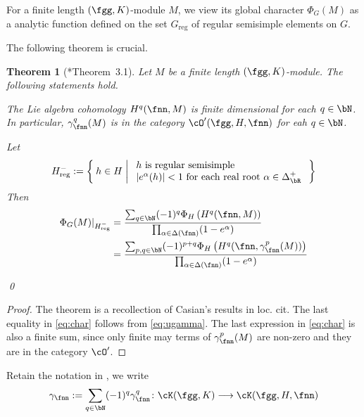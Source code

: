 \documentclass[12pt,a4paper]{amsart}
\def\abs#1{\left|{#1}\right|}
\DeclareMathOperator{\Ann}{Ann}
\numberwithin{equation}{section}
\newtheorem{thm}{Theorem}[section]
\theoremstyle{remark}
\def\WT#1{\Delta(#1)}
\def\Greg{G_{\text{reg}}}
\def\Hnreg{H^-_{\text{reg}}}
\newcommand{\Grt}{\cK}
\begin{document}
For a finite length $(\fgg,K)$-module $M$, we view its global character
$\Phi_{G}(M)$ as a analytic function defined on the set $\Greg$ of regular
semisimple elements on $G$.


The following theorem is crucial.
\begin{thm}[\cite{Cas}*{Theorem~3.1}]\label{thm:gamma.HC}
  Let $M$ be a finite length $(\fgg,K)$-module. The following statements hold.
  \begin{enumT}
    \item The Lie algebra cohomology $H^{q}(\fnn,M)$ is finite dimensional for
    each $q\in \bN$. In particular, $\gamma_{\fnn}^{q}(M)$ is in the category
    $\cO'(\fgg,H,\fnn)$ for eah $q\in \bN$.
    \item
    Let
    \[
      \Hnreg:= \Set{h\in H|
        \begin{array}{l}
          \text{$h$ is regular semisimple}\\
          \abs{e^{\alpha}(h)}<1 \text{ for each real root }
          \alpha\in \Delta^{+}_{\bR}
        \end{array}
      }
    \]
    Then
    \begin{equation}\label{eq:char}
      \begin{split}
        \Phi_{G}(M)|_{\Hnreg} &= \frac{\sum_{q\in \bN} (-1)^{q}\Phi_{H} \left(H^{q}(\fnn,M)\right)}
        {\prod_{\alpha\in \WT{\fnn}}(1- e^{\alpha})}\\
        &= \frac{\sum_{p,q\in \bN} (-1)^{p+q}\Phi_{H} \left(H^{q}(\fnn,\gamma_{\fnn}^{p}(M))\right)}
        {\prod_{\alpha\in \WT{\fnn}}(1- e^{\alpha})}\\
      \end{split}
    \end{equation}
  \end{enumT}
  \qed
\end{thm}
\begin{proof}
  The theorem is a recollection of Casian's results in loc. cit. The last
  equality in \eqref{eq:char} follows from \eqref{eq:ugamma}. The last
  expression in \eqref{eq:char} is also a finite sum, since only finite may
  terms of $\gamma_{\fnn}^{p}(M)$ are non-zero and they are in the category
  $\cO'$.
\end{proof}


Retain the notation in , we write
\[
  \gamma_{\fnn}:= \sum_{q\in \bN} (-1)^{q} \gamma^{q}_{\fnn}\colon \Grt(\fgg,K) \longrightarrow \Grt(\fgg,H,\fnn)
\]
\end{document}

